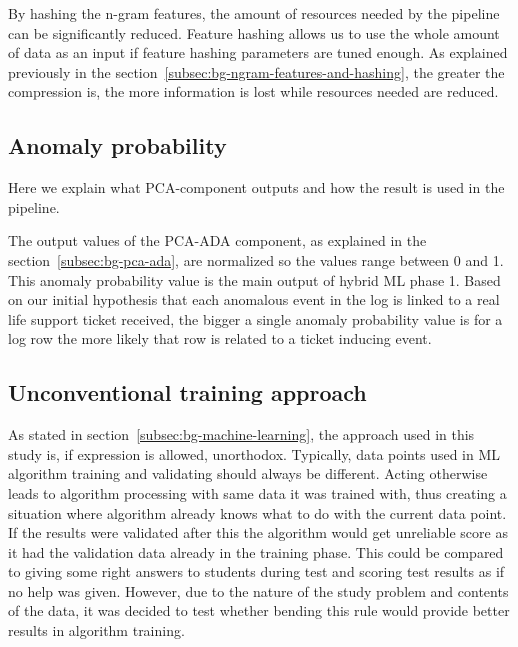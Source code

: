 By hashing the n-gram features,
the amount of resources needed by the pipeline
can be significantly reduced.
Feature hashing allows us to use the whole amount of data as an input
if feature hashing parameters are tuned enough.
As explained previously in the section~\ref{subsec:bg-ngram-features-and-hashing},
the greater the compression is,
the more information is lost
while resources needed are reduced.





%



\subsection{Anomaly probability}\label{subsec:pipe-anomaly-probability}
\begin{itcomment}
    Here we explain what PCA-component outputs and how the result is used in the pipeline.
\end{itcomment}

The output values of the PCA-ADA component,
as explained in the section~\ref{subsec:bg-pca-ada},
are normalized so the values range between 0 and 1.
This anomaly probability value
is the main output of hybrid ML phase 1.
Based on our initial hypothesis
that each anomalous event in the log
is linked to a real life support ticket received,
the bigger a single anomaly probability value is for a log row
the more likely that row is related to a ticket inducing event.




\subsection{Unconventional training approach}\label{subsec:pipe-unconventional-training}

As stated in section~\ref{subsec:bg-machine-learning},
the approach used in this study is,
if expression is allowed, unorthodox.
Typically,
data points used in ML algorithm training and validating
should always be different.
Acting otherwise leads to algorithm processing with
same data it was trained with,
thus creating a situation
where algorithm already knows what to do with the current data point.
If the results were validated after this
the algorithm would get unreliable score
as it had the validation data already in the training phase.
This could be compared to
giving some right answers to students during test
and scoring test results as if no help was given.
However,
due to the nature of the study problem and contents of the data,
it was decided to test whether bending this rule
would provide better results in algorithm training.

